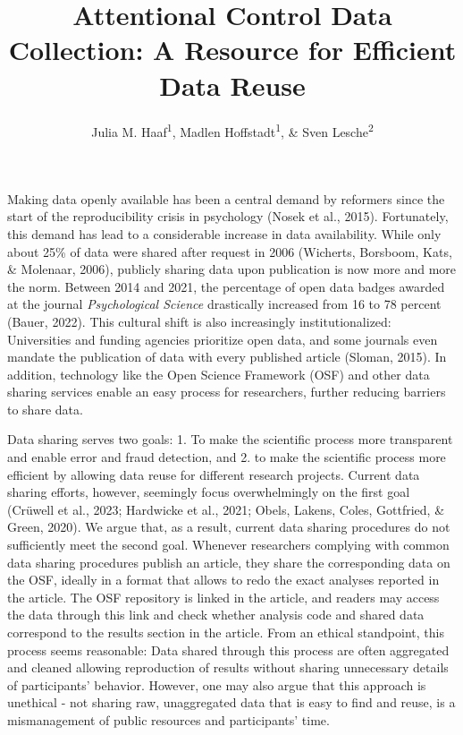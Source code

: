 \documentclass[
  man,floatsintext]{apa6}
\title{Attentional Control Data Collection: A Resource for Efficient Data Reuse}
\author{Julia M. Haaf\textsuperscript{1}, Madlen Hoffstadt\textsuperscript{1}, \& Sven Lesche\textsuperscript{2}}
\date{}
\affiliation{\vspace{0.5cm}\textsuperscript{1} University of Amsterdam\\\textsuperscript{2} University of Heidelberg}
\begin{document}
\maketitle

Making data openly available has been a central demand by reformers since the start of the reproducibility crisis in psychology (Nosek et al., 2015). Fortunately, this demand has lead to a considerable increase in data availability. While only about 25\% of data were shared after request in 2006 (Wicherts, Borsboom, Kats, \& Molenaar, 2006), publicly sharing data upon publication is now more and more the norm. Between 2014 and 2021, the percentage of open data badges awarded at the journal \emph{Psychological Science} drastically increased from 16 to 78 percent (Bauer, 2022). This cultural shift is also increasingly institutionalized: Universities and funding agencies prioritize open data, and some journals even mandate the publication of data with every published article (Sloman, 2015). In addition, technology like the Open Science Framework (OSF) and other data sharing services enable an easy process for researchers, further reducing barriers to share data.

Data sharing serves two goals: 1. To make the scientific process more transparent and enable error and fraud detection, and 2. to make the scientific process more efficient by allowing data reuse for different research projects. Current data sharing efforts, however, seemingly focus overwhelmingly on the first goal (Crüwell et al., 2023; Hardwicke et al., 2021; Obels, Lakens, Coles, Gottfried, \& Green, 2020). We argue that, as a result, current data sharing procedures do not sufficiently meet the second goal. Whenever researchers complying with common data sharing procedures publish an article, they share the corresponding data on the OSF, ideally in a format that allows to redo the exact analyses reported in the article. The OSF repository is linked in the article, and readers may access the data through this link and check whether analysis code and shared data correspond to the results section in the article. From an ethical standpoint, this process seems reasonable: Data shared through this process are often aggregated and cleaned allowing reproduction of results without sharing unnecessary details of participants' behavior. However, one may also argue that this approach is unethical - not sharing raw, unaggregated data that is easy to find and reuse, is a mismanagement of public resources and participants' time.
\end{document}

